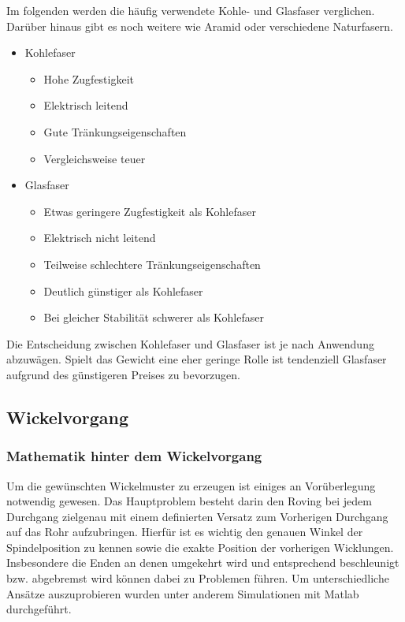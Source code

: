 \documentclass[12pt, a4paper, ngerman]{article}
\begin{document}
Im folgenden werden die häufig verwendete Kohle- und Glasfaser verglichen. Darüber hinaus gibt es noch weitere wie Aramid oder verschiedene Naturfasern.

\begin{itemize}
	\item Kohlefaser
	\begin{itemize}
		\item Hohe Zugfestigkeit
		\item Elektrisch leitend
		\item Gute Tränkungseigenschaften
		\item Vergleichsweise teuer
	\end{itemize}
	\item Glasfaser
	\begin{itemize}
		\item Etwas geringere Zugfestigkeit als Kohlefaser
		\item Elektrisch nicht leitend
		\item Teilweise schlechtere Tränkungseigenschaften
		\item Deutlich günstiger als Kohlefaser
		\item Bei gleicher Stabilität schwerer als Kohlefaser
	\end{itemize}
\end{itemize}

Die Entscheidung zwischen Kohlefaser und Glasfaser ist je nach Anwendung abzuwägen. Spielt das Gewicht eine eher geringe Rolle ist tendenziell Glasfaser aufgrund des günstigeren Preises zu bevorzugen.





\subsection{Wickelvorgang}

\subsubsection{Mathematik hinter dem Wickelvorgang}
Um die gewünschten Wickelmuster zu erzeugen ist einiges an Vorüberlegung notwendig gewesen. Das Hauptproblem besteht darin den Roving bei jedem Durchgang zielgenau mit einem definierten Versatz zum Vorherigen Durchgang auf das Rohr aufzubringen. Hierfür ist es wichtig den genauen Winkel der Spindelposition zu kennen sowie die exakte Position der vorherigen Wicklungen. Insbesondere die Enden an denen umgekehrt wird und entsprechend beschleunigt bzw. abgebremst wird können dabei zu Problemen führen. Um unterschiedliche Ansätze auszuprobieren wurden unter anderem Simulationen mit Matlab durchgeführt.
\end{document}
